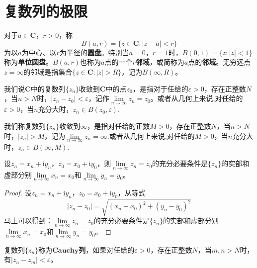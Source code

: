 \documentclass[../../main.tex]{subfiles}
\begin{document}
\section{复数列的极限}

\begin{definition}
对于\(a \in \mathbf{C}\)，\(r > 0\)，称
\[
B(a, r) = \{ z \in \mathbf{C} : | z - a | < r \}
\]
为以\(a\)为中心、以\(r\)为半径的\textbf{圆盘}。特别当\(a = 0\)，\(r = 1\)时，\(B(0, 1) = \{ z : | z | < 1 \}\)称为\textbf{单位圆盘}。\(B(a, r)\)也称为\(a\)点的一个\textbf{\(r\)邻域}，或简称为\(a\)点的\textbf{邻域}。无穷远点\(z = \infty\)的邻域是指集合\(\{ z \in \mathbf{C} : | z | > R \}\)，记为\(B(\infty, R)\)。
\end{definition}

\begin{definition}
我们说\(\mathbf{C}\)中的复数列\(\{ z_n \}\)收敛到\(\mathbf{C}\)中的点\(z_0\)，是指对于任给的\(\varepsilon > 0\)，存在正整数\(N\)，当\(n > N\)时，\(| z_n - z_0 | < \varepsilon\)，记作\(\lim\limits_{n \to \infty} z_n = z_0\)。或者从几何上来说,对任给的\(\varepsilon > 0\)，当\(n\)充分大时，\(z_n \in B(z_0, \varepsilon)\).

我们称复数列\(\{ z_n \}\)收敛到\(\infty\)，是指对任给的正数\(M > 0\)，存在正整数\(N\)，当\(n > N\)时，\(| z_n | > M\)，记为\(\lim\limits_{n \to \infty} z_n = \infty\).或者从几何上来说,对任给的\(M > 0\)，当\(n\)充分大时，\(z_n \in B(\infty, M)\).
\end{definition}

\begin{theorem}\label{theorem:复数收敛的充要条件}
设\(z_n = x_n + \mathrm{i}y_n\)，\(z_0 = x_0 + \mathrm{i}y_0\)，则\(\lim\limits_{n \to \infty} z_n = z_0\)的充分必要条件是\(\{ z_n \}\)的实部和虚部分别\(\lim\limits_{n \to \infty} x_n = x_0\)和\(\lim\limits_{n \to \infty} y_n = y_0\)。
\end{theorem}
\begin{proof}
设\(z_n = x_n + \mathrm{i}y_n\)，\(z_0 = x_0 + \mathrm{i}y_0\)，从等式
\[
| z_n - z_0 | = \sqrt{(x_n - x_0)^2 + (y_n - y_0)^2}
\]
马上可以得到：\(\lim\limits_{n \to \infty} z_n = z_0\)的充分必要条件是\(\{ z_n \}\)的实部和虚部分别\(\lim\limits_{n \to \infty} x_n = x_0\)和\(\lim\limits_{n \to \infty} y_n = y_0\)。
\end{proof}

\begin{definition}
复数列\(\{ z_n \}\)称为\(\mathbf{Cauchy}\)\textbf{列}，如果对任给的\(\varepsilon > 0\)，存在正整数\(N\)，当\(m, n > N\)时，有\(| z_n - z_m | < \varepsilon\)。
\end{definition}
\end{document}
